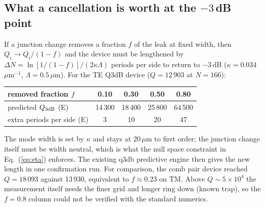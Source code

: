 \documentclass[11pt,a4paper]{article}
\begin{document}
\subsection*{What a cancellation is worth at the $-3$\,dB point}
If a junction change removes a fraction $f$ of the leak at fixed width, then $Q_i\to Q_i/(1-f)$ and the device
must be lengthened by $\Delta N=\ln[1/(1-f)]/(2\kappa\Lambda)$ periods per side to return to $-3$\,dB
($\kappa=0.034$\,$\mu$m$^{-1}$, $\Lambda=0.5$\,$\mu$m). For the TE Q3dB device ($Q=12\,903$ at $N=166$):
\begin{center}\begin{tabular}{lcccc}\hline
removed fraction $f$ & 0.10 & 0.30 & 0.50 & 0.80\\\hline
predicted $Q_{3\rm dB}$ (E) & 14\,300 & 18\,400 & 25\,800 & 64\,500\\
extra periods per side (E) & 3 & 10 & 20 & 47\\\hline
\end{tabular}\end{center}
The mode width is set by $\kappa$ and stays at 20\,$\mu$m to first order; the junction change itself must be
width neutral, which is what the null space constraint in Eq.~(\ref{eq:eta}) enforces. The existing q3db
predictive engine then gives the new length in one confirmation run. For comparison, the comb pair device
reached $Q=18\,093$ against 13\,930, equivalent to $f\approx0.23$ on TM. Above $Q\sim5\times10^4$ the measurement itself needs
the finer grid and longer ring down (known trap), so the $f=0.8$ column could not be verified with the standard
numerics.
\end{document}
